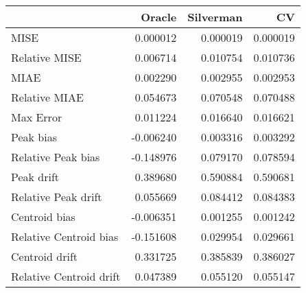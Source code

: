 \begin{tabular}{lrrr}
  \hline
 & Oracle & Silverman & CV \\ 
  \hline
MISE & 0.000012 & 0.000019 & 0.000019 \\ 
  Relative MISE & 0.006714 & 0.010754 & 0.010736 \\ 
  MIAE & 0.002290 & 0.002955 & 0.002953 \\ 
  Relative MIAE & 0.054673 & 0.070548 & 0.070488 \\ 
  Max Error & 0.011224 & 0.016640 & 0.016621 \\ 
  Peak bias & -0.006240 & 0.003316 & 0.003292 \\ 
  Relative Peak bias & -0.148976 & 0.079170 & 0.078594 \\ 
  Peak drift & 0.389680 & 0.590884 & 0.590681 \\ 
  Relative Peak drift & 0.055669 & 0.084412 & 0.084383 \\ 
  Centroid bias & -0.006351 & 0.001255 & 0.001242 \\ 
  Relative Centroid bias & -0.151608 & 0.029954 & 0.029661 \\ 
  Centroid drift & 0.331725 & 0.385839 & 0.386027 \\ 
  Relative Centroid drift & 0.047389 & 0.055120 & 0.055147 \\ 
   \hline
\end{tabular}
